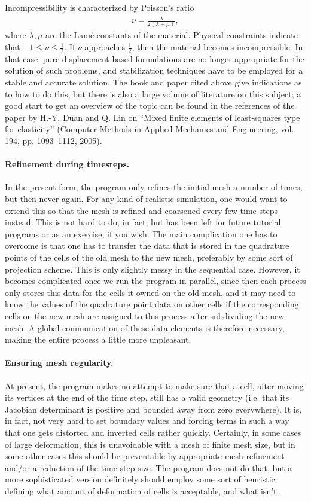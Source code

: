 \documentclass{article}
\begin{document}
Incompressibility is characterized by Poisson's ratio
\begin{gather*}
  \nu = \frac{\lambda}{2(\lambda+\mu)},
\end{gather*}
where $\lambda,\mu$ are the Lam\'e constants of the material.
Physical constraints indicate that $-1\le \nu\le \tfrac 12$. If $\nu$
approaches $\tfrac 12$, then the material becomes incompressible. In that
case, pure displacement-based formulations are no longer appropriate for the
solution of such problems, and stabilization techniques have to be employed
for a stable and accurate solution. The book and paper cited above give
indications as to how to do this, but there is also a large volume of
literature on this subject; a good start to get an overview of the topic can
be found in the references of the paper by
H.-Y. Duan and Q. Lin on ``Mixed finite elements of least-squares type for
elasticity'' (Computer Methods in Applied Mechanics and Engineering, vol. 194,
pp. 1093--1112, 2005).


\paragraph*{Refinement during timesteps.} In the present form, the program
only refines the initial mesh a number of times, but then never again. For any
kind of realistic simulation, one would want to extend this so that the mesh
is refined and coarsened every few time steps instead. This is not hard to do,
in fact, but has been left for future tutorial programs or as an exercise, if
you wish. The main complication one has to overcome is that one has to
transfer the data that is stored in the quadrature points of the cells of the
old mesh to the new mesh, preferably by some sort of projection scheme. This
is only slightly messy in the sequential case. However, it becomes complicated once
we run the program in parallel, since then each process only stores this data
for the cells it owned on the old mesh, and it may need to know the values of
the quadrature point data on other cells if the corresponding cells on the new
mesh are assigned to this process after subdividing the new mesh. A global
communication of these data elements is therefore necessary, making the entire
process a little more unpleasant.


\paragraph*{Ensuring mesh regularity.} At present, the program makes no attempt
to make sure that a cell, after moving its vertices at the end of the time
step, still has a valid geometry (i.e. that its Jacobian determinant is
positive and bounded away from zero everywhere). It is, in fact, not very hard
to set boundary values and forcing terms in such a way that one gets distorted
and inverted cells rather quickly. Certainly, in some cases of large
deformation, this is unavoidable with a mesh of finite mesh size, but in some
other cases this should be preventable by appropriate mesh refinement and/or a
reduction of the time step size. The program does not do that, but a more
sophisticated version definitely should employ some sort of heuristic defining
what amount of deformation of cells is acceptable, and what isn't.
\end{document}
